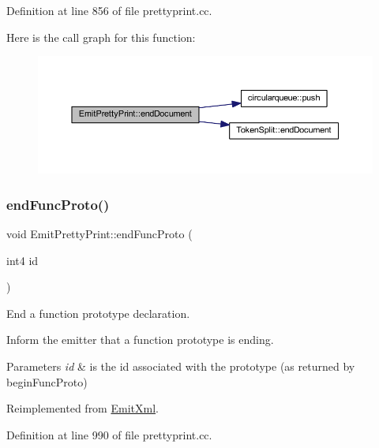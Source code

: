 Definition at line 856 of file prettyprint.\+cc.

Here is the call graph for this function\+:
\nopagebreak
\begin{figure}[H]
\begin{center}
\leavevmode
\includegraphics[width=350pt]{class_emit_pretty_print_aca37d689adabda9dd84cc333c87cabd8_cgraph}
\end{center}
\end{figure}
\mbox{\label{class_emit_pretty_print_a4eac637afa829305fb6cda48ed09bcbb}} 
\subsubsection{\texorpdfstring{endFuncProto()}{endFuncProto()}}
{\footnotesize\ttfamily void Emit\+Pretty\+Print\+::end\+Func\+Proto (\begin{DoxyParamCaption}\item[{int4}]{id }\end{DoxyParamCaption})\hspace{0.3cm}{\ttfamily [virtual]}}



End a function prototype declaration. 

Inform the emitter that a function prototype is ending. 
\begin{DoxyParams}{Parameters}
{\em id} & is the id associated with the prototype (as returned by begin\+Func\+Proto) \\
\hline
\end{DoxyParams}


Reimplemented from \mbox{\hyperlink{class_emit_xml_a0c1fad40b58e0a977f69ed80fb6f3bc8}{Emit\+Xml}}.



Definition at line 990 of file prettyprint.\+cc.

